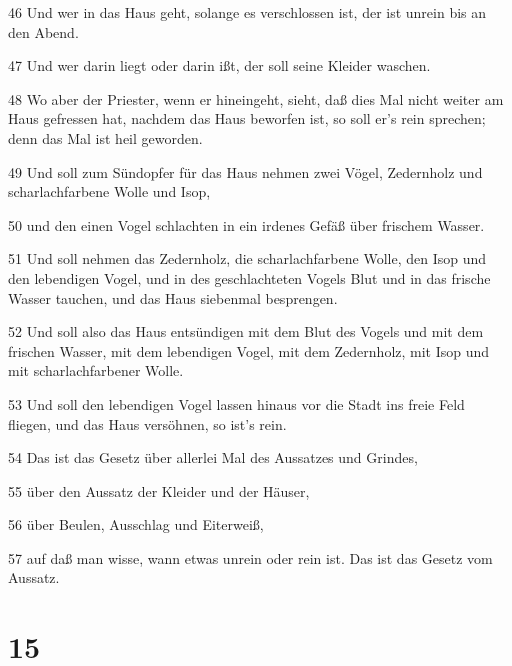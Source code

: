 \par 46 Und wer in das Haus geht, solange es verschlossen ist, der ist unrein bis an den Abend.
\par 47 Und wer darin liegt oder darin ißt, der soll seine Kleider waschen.
\par 48 Wo aber der Priester, wenn er hineingeht, sieht, daß dies Mal nicht weiter am Haus gefressen hat, nachdem das Haus beworfen ist, so soll er's rein sprechen; denn das Mal ist heil geworden.
\par 49 Und soll zum Sündopfer für das Haus nehmen zwei Vögel, Zedernholz und scharlachfarbene Wolle und Isop,
\par 50 und den einen Vogel schlachten in ein irdenes Gefäß über frischem Wasser.
\par 51 Und soll nehmen das Zedernholz, die scharlachfarbene Wolle, den Isop und den lebendigen Vogel, und in des geschlachteten Vogels Blut und in das frische Wasser tauchen, und das Haus siebenmal besprengen.
\par 52 Und soll also das Haus entsündigen mit dem Blut des Vogels und mit dem frischen Wasser, mit dem lebendigen Vogel, mit dem Zedernholz, mit Isop und mit scharlachfarbener Wolle.
\par 53 Und soll den lebendigen Vogel lassen hinaus vor die Stadt ins freie Feld fliegen, und das Haus versöhnen, so ist's rein.
\par 54 Das ist das Gesetz über allerlei Mal des Aussatzes und Grindes,
\par 55 über den Aussatz der Kleider und der Häuser,
\par 56 über Beulen, Ausschlag und Eiterweiß,
\par 57 auf daß man wisse, wann etwas unrein oder rein ist. Das ist das Gesetz vom Aussatz.

\chapter{15}

